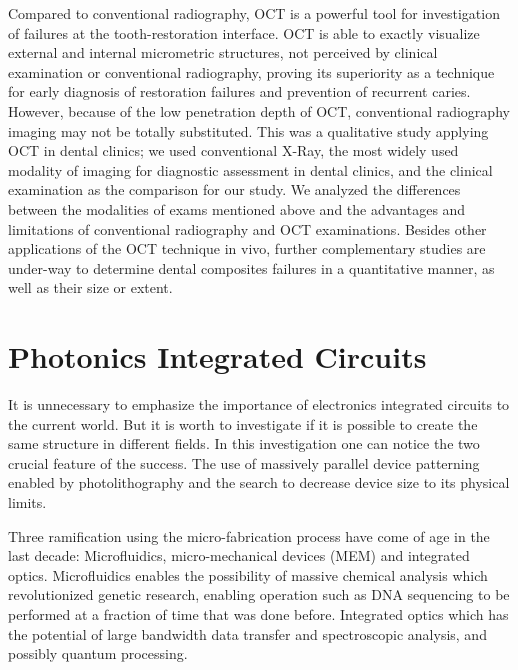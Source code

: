 \documentclass[12pt,twoside,english]{book}
\renewcommand{\~}{\perispomeni}%
\numberwithin{equation}{section}
\numberwithin{figure}{section}
\begin{document}
Compared to conventional radiography, OCT is a powerful tool for investigation of failures at the tooth-restoration interface. OCT is able to exactly visualize external and internal micrometric structures, not perceived by clinical examination or conventional radiography, proving its superiority as a technique for early diagnosis of restoration failures and prevention of recurrent caries. However, because of the low penetration depth of OCT, conventional radiography imaging may not be totally substituted. This was a qualitative study applying OCT in dental clinics; we used conventional X-Ray, the most widely used modality of imaging for diagnostic assessment in dental clinics, and the clinical examination as the comparison for our study. We analyzed the differences between the modalities of exams mentioned above and the advantages and limitations of conventional radiography and OCT examinations. Besides other applications of the OCT technique in vivo, further complementary studies are under-way to determine dental composites failures in a quantitative manner, as well as their size or extent.

\chapter{Photonics Integrated Circuits}


It is unnecessary to emphasize the importance of electronics integrated circuits to the current world. But it is worth to investigate if it is possible to create the same structure in different fields. In this investigation one can notice the two crucial feature of the success. The use of massively parallel device patterning enabled by photolithography and the search to decrease device size to its physical limits.

Three ramification using the micro-fabrication process have come of age in the last decade: Microfluidics, micro-mechanical devices (MEM) and integrated optics. Microfluidics enables the possibility of massive chemical analysis which revolutionized genetic research, enabling operation such as DNA sequencing to be performed at a fraction of time that was done before. Integrated optics which has the potential of large bandwidth data transfer and spectroscopic analysis, and possibly quantum processing.
\end{document}

